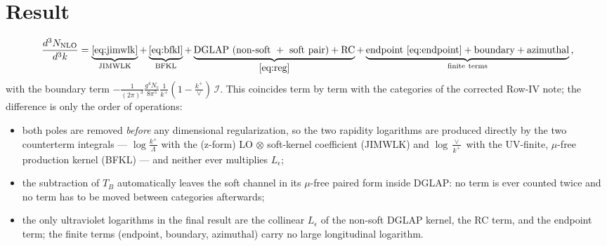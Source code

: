 \documentclass[9pt]{article}
\newcommand{\Leps}{L_{\epsilon}}
\begin{document}
\section{Result}
\begin{align}
\frac{d^{3}N_{\rm NLO}}{d^{3}k}
=\underbrace{\eqref{eq:jimwlk}}_{\rm JIMWLK}
+\underbrace{\eqref{eq:bfkl}}_{\rm BFKL}
+\underbrace{{\rm DGLAP\ (non\text{-}soft\ +\ soft\ pair)}+{\rm RC}}_{\eqref{eq:reg}}
+\underbrace{{\rm endpoint\ \eqref{eq:endpoint}}+{\rm boundary}+{\rm azimuthal}}_{\rm finite\ terms}\,,
\end{align}
with the boundary term $-\frac{1}{(2\pi)^{3}}\frac{g^{4}N_{c}}{8\pi^{5}}\frac{1}{k^{+}}
(1-\frac{k^{+}}{\vee})\,\mathcal I$. This coincides term by term with the categories of the
corrected Row-IV note; the difference is only the order of operations:
\begin{itemize}
\item[(i)] both poles are removed \emph{before} any dimensional regularization, so the two
rapidity logarithms are produced directly by the two counterterm integrals ---
$\log\frac{k^{+}}{\Lambda}$ with the (z-form) LO$\,\otimes\,$soft-kernel coefficient (JIMWLK)
and $\log\frac{\vee}{k^{+}}$ with the UV-finite, $\mu$-free production kernel (BFKL) --- and
neither ever multiplies $\Leps$;
\item[(ii)] the subtraction of $T_{B}$ automatically leaves the soft channel in its $\mu$-free
paired form inside DGLAP: no term is ever counted twice and no term has to be moved between
categories afterwards;
\item[(iii)] the only ultraviolet logarithms in the final result are the collinear $\Leps$ of
the non-soft DGLAP kernel, the RC term, and the endpoint term; the finite terms (endpoint,
boundary, azimuthal) carry no large longitudinal logarithm.
\end{itemize}
\end{document}
